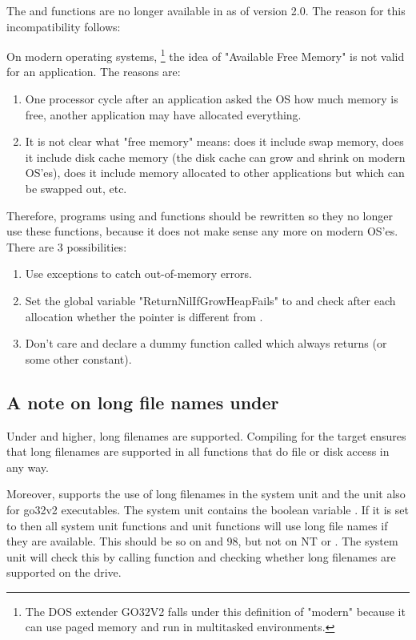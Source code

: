 \begin{remark}
The  and  functions are no longer available in
\fpc as of version 2.0. The reason for this incompatibility follows:

On modern operating systems, \footnote{The DOS extender GO32V2 falls under this 
definition of "modern" because it can use paged memory and run in 
multitasked environments.} the idea of "Available Free Memory" is not valid for an
application.
The reasons are:
\begin{enumerate} 
\item One processor cycle after an application asked the OS how much memory is free,
another application may have allocated everything.
\item It is not clear what "free memory" means: does it include swap memory,
does it include disk cache memory (the disk cache can grow and shrink on
modern OS'es), does it include memory allocated to other applications but
which can be swapped out, etc.
\end{enumerate}

Therefore, programs using  and  functions 
should be rewritten so they no longer use these functions, because
it does not make sense any more on modern OS'es. There are 3 possibilities:
\begin{enumerate}
\item Use exceptions to catch out-of-memory errors.
\item Set the global variable "ReturnNilIfGrowHeapFails" to 
and check after each allocation whether the pointer is different from
.
\item Don't care and declare a dummy function called  
which always returns  (or some other constant).
\end{enumerate}

\end{remark}

\subsection{A note on long file names under \dos}
Under  and higher, long filenames are supported. Compiling
for the \windows target ensures that long filenames are supported in all
functions that do file or disk access in any way.

Moreover, \fpc supports the use of long filenames in the system unit and
the  unit also for go32v2 executables. The system unit contains the
boolean variable . If it is set to  then all
system unit functions and  unit functions will use long file names
if they are available. This should be so on  and 98, but
not on \windows NT or . The system unit will check this 
by calling \dos function  and checking whether long filenames 
are supported on the  drive.

